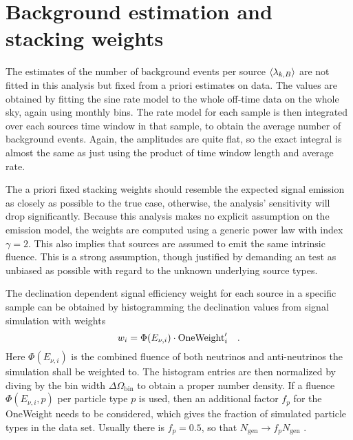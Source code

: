 \section{Background estimation and stacking weights}
The estimates of the number of background events per source $\Braket{\lambda_{k,B}}$ are not fitted in this analysis but fixed from a priori estimates on data.
The values are obtained by fitting the sine rate model to the whole off-time data on the whole sky, again using monthly bins.
The rate model for each sample is then integrated over each sources time window in that sample, to obtain the average number of background events.
Again, the amplitudes are quite flat, so the exact integral is almost the same as just using the product of time window length and average rate.

The a priori fixed stacking weights should resemble the expected signal emission as closely as possible to the true case, otherwise, the analysis' sensitivity will drop significantly.
Because this analysis makes no explicit assumption on the emission model, the weights are computed using a generic power law with index $\gamma = 2$.
This also implies that sources are assumed to emit the same intrinsic fluence.
This is a strong assumption, though justified by demanding an test as unbiased as possible with regard to the unknown underlying source types.

The declination dependent signal efficiency weight for each source in a specific sample can be obtained by histogramming the declination values from signal simulation with weights
\begin{equation}
  w_i = \Phi(E_{\nu,i})\cdot\text{OneWeight}'_i
  \quad\text{.}
\end{equation}
Here $\Phi(E_{\nu,i})$ is the combined fluence of both neutrinos and anti-neutrinos the simulation shall be weighted to.
The histogram entries are then normalized by diving by the bin width $\Delta\Omega_\text{bin}$ to obtain a proper number density.
If a fluence $\Phi(E_{\nu,i}, p)$ per particle type $p$ is used, then an additional factor $f_p$ for the OneWeight needs to be considered, which gives the fraction of simulated particle types in the data set.
Usually there is $f_p=0.5$, so that $N_\text{gen}\rightarrow f_p N_\text{gen}$ \cite{Gazizov:2004va}.

